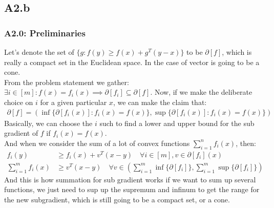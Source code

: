 \documentclass[]{article}
\begin{document}
    \subsection*{A2.b}
        \subsubsection*{A2.0: Preliminaries}
            Let's denote the set of $\{g: f(y) \ge  f(x) + g^T(y - x)\}$ to be $\partial[f]$, which is really a compact set in the Euclidean space. In the case of vector is going to be a cone. 
            \\[1.1em]
            From the problem statement we gather: $\exists i \in [m]: f(x) =f_i(x)\implies \partial[f_i]\subseteq \partial[f]$. Now, if we make the deliberate choice on $i$ for a given particular $x$, we can make the claim that:
            \begin{align*}\tag{A2.0.1}\label{eqn:A2.0.1}
                \partial[f]= \left(
                    \inf \lbrace \partial[f_i(x)]: f_i(x) = f(x)\rbrace, 
                    \sup \lbrace \partial[f_i(x)]: f_i(x) = f(x)\rbrace
                \right)
            \end{align*}
            Basically, we can choose the $i$ such to find a lower and upper bound for the sub gradient of $f$ if $f_i(x) = f(x)$. 
            \\[1.1em]
            And when we consider the sum of a lot of convex functions $\sum_{i = 1}^{n}f_i(x)$, then:
            \begin{align*}\tag{A2.0.2}\label{eqn:A2.0.2}
                f_i(y) &\ge f_i(x) + v^T(x - y)  \quad \forall i \in [m], v \in \partial[f_i](x)
                \\
                \sum_{i=1}^{m}f_i(x) &\ge 
                v^T(x - y) 
                \quad \forall v \in 
                \left(
                    \sum_{i=1}^{m}\inf \{\partial [f_i]\} , \sum_{i=1}^{m} \sup\{\partial [f_i]\}
                \right)
            \end{align*}
            And this is how summation for sub gradient works if we want to sum up several functions, we just need to sup up the supremum and infinum to get the range for the new subgradient, which is still going to be a compact set, or a cone. 
\end{document}
